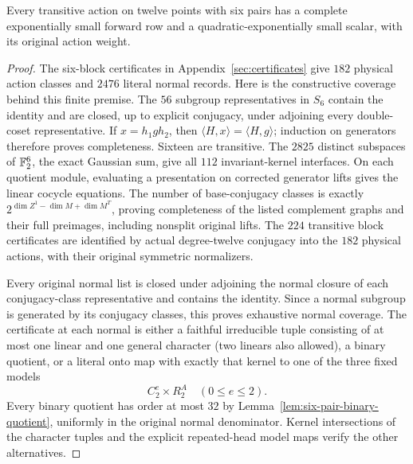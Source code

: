 \begin{proposition}\label{prop:six-pairs}
Every transitive action on twelve points with six pairs has a complete
exponentially small forward row and a quadratic-exponentially small
scalar, with its original action weight.
\end{proposition}
\begin{proof}
The six-block certificates in Appendix~\ref{sec:certificates} give
$182$ physical action classes and $2476$ literal normal records.
Here is the constructive coverage behind this finite premise.
The $56$ subgroup representatives in $S_6$ contain the identity
and are closed, up to explicit conjugacy, under adjoining every
double-coset representative. If $x=h_1gh_2$, then
$\langle H,x\rangle=\langle H,g\rangle$; induction on generators
therefore proves completeness. Sixteen are transitive. The $2825$
distinct subspaces of $\mathbb F_2^6$, the exact Gaussian sum, give all
$112$ invariant-kernel interfaces. On each quotient module,
evaluating a presentation on corrected generator lifts gives the
linear cocycle equations. The number of base-conjugacy classes is
exactly $2^{\dim Z^1-\dim M+\dim M^T}$, proving completeness of
the listed complement graphs and their full preimages, including
nonsplit original lifts. The $224$ transitive block certificates
are identified by actual degree-twelve conjugacy into the $182$
physical actions, with their original symmetric normalizers.

Every original normal list is closed under adjoining the normal
closure of each conjugacy-class representative and contains the
identity. Since a normal subgroup is generated by its conjugacy
classes, this proves exhaustive normal coverage. The certificate
at each normal is either a faithful irreducible tuple consisting
of at most one linear and one general character (two linears
also allowed), a binary quotient, or a literal onto map with
exactly that kernel to one of the three fixed models
\[
 C_2^e\times R_2^A\quad(0\leq e\leq2).
\]
Every binary quotient has order at most $32$ by
Lemma~\ref{lem:six-pair-binary-quotient}, uniformly in the original
normal denominator. Kernel intersections of the character tuples
and the explicit repeated-head model maps verify the other alternatives.


\end{proof}
